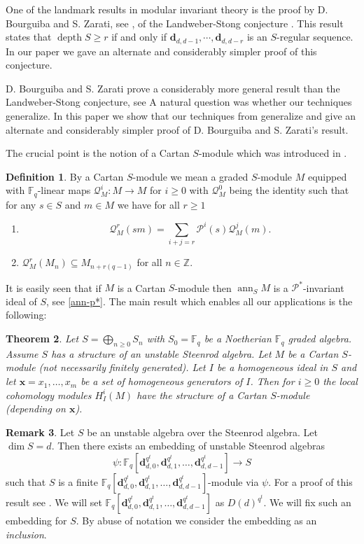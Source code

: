 \documentclass{amsart}
\newcommand{\F}{\mathbb{F} }
\newcommand{\Z}{\mathbb{Z} }
\newcommand{\Pc}{\mathcal{P} }
\newcommand{\Qc}{\mathcal{Q} }
\newcommand{\db}{\mathbf{d} }
\newcommand{\xb}{\mathbf{x} }
\newcommand{\rt}{\rightarrow}
\newcommand{\depth}{\operatorname{depth}}
\newcommand{\ann}{\operatorname{ann}}
\theoremstyle{plain}
\newtheorem{theorem}{Theorem}[section]
\theoremstyle{definition}
\newtheorem{definition}[theorem]{Definition}
\newtheorem{remark}[theorem]{Remark}
\theoremstyle{remark}
\begin{document}
 One of the landmark results in modular invariant theory is the proof  by D. Bourguiba and S. Zarati, see \cite{bz}, of
the Landweber-Stong conjecture \cite{LS}. This result states that $\depth S \geq r$ if and only if $\db_{d,d-1}, \cdots, \db_{d, d-r}$ is an $S$-regular sequence. In our paper \cite{P} we gave an  alternate and considerably simpler  proof of this conjecture.

D. Bourguiba and S. Zarati prove a considerably more general result than
the Landweber-Stong conjecture, see \cite[1.3]{bz} A natural question was whether our techniques generalize. In this paper we show that our techniques from \cite{P} generalize and give an alternate and considerably simpler proof of D. Bourguiba and S. Zarati's result.

The crucial point is the notion of a Cartan $S$-module which was introduced in \cite{P}.
 \begin{definition}
By a Cartan $S$-module we mean a graded  $S$-module $M$ equipped with $\F_q$-linear maps $\Qc^i_M \colon M \rt M$ for $i \geq 0$ with $\Qc^0_M $ being the identity such that for any $s \in S$ and $m \in M$ we have for all $r \geq 1$
\begin{enumerate}
  \item $$ \Qc^r_M(sm) = \sum_{i+j = r}\Pc^i(s)\Qc^j_M(m).$$
  \item  $\Qc^r_M(M_n) \subseteq M_{n + r(q-1)} $ for all $n \in \Z$.
\end{enumerate}
\end{definition}

 It is easily seen that if $M$ is a Cartan $S$-module then $\ann_S M$ is a $\Pc^*$-invariant ideal of $S$, see \ref{ann-p*}.
 The main result which enables all our applications is the following:
 \begin{theorem}
 \label{jim} Let $S = \bigoplus_{n \geq 0}S_n$ with $S_0 = \F_q$ be a Noetherian $\F_q$ graded algebra. Assume $S$ has a structure of an unstable Steenrod algebra. Let $M$ be a Cartan $S$-module (not necessarily finitely generated). Let $I$ be a homogeneous ideal in $S$ and let $\xb = x_1, \ldots, x_m$ be a set of homogeneous generators of $I$. Then for $i \geq 0$ the local cohomology modules $H^i_I(M)$ have the structure of a Cartan $S$-module (depending on $\xb$).
 \end{theorem}

\begin{remark}\label{lannes}
Let $S$ be an unstable algebra over the Steenrod algebra. Let $\dim S = d$. Then there exists an embedding  of unstable Steenrod algebras $$\psi \colon \F_q[ \db_{d,0}^{q^t}, \db_{d, 1}^{q^t}, \ldots, \db_{d, d-1}^{q^t}]\rt S$$ such that $S$ is a finite $\F_q[ \db_{d,0}^{q^t}, \db_{d, 1}^{q^t}, \ldots, \db_{d, d-1}^{q^t}]$-module via $\psi$. For a proof of this result see \cite[1.2]{bz}.
We will set  $\F_q[ \db_{d,0}^{q^t}, \db_{d, 1}^{q^t}, \ldots, \db_{d, d-1}^{q^t}]$ as $D(d)^{q^t}$. We will fix such an embedding for $S$. By abuse of notation we consider the embedding  as an \emph{inclusion}.
\end{remark}
\end{document}
